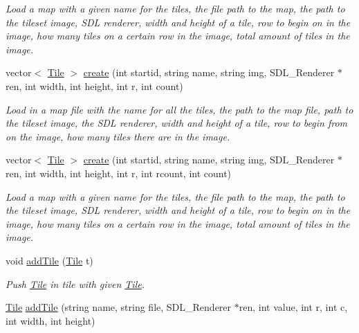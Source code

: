 \begin{DoxyCompactItemize}
\begin{DoxyCompactList}\small\item\em Load a map with a given name for the tiles, the file path to the map, the path to the tileset image, S\+DL renderer, width and height of a tile, row to begin on in the image, how many tiles on a certain row in the image, total amount of tiles in the image. \end{DoxyCompactList}\item 
vector$<$ \hyperlink{classTile}{Tile} $>$ \hyperlink{classTileset_a9d93cb00fc20938748075d94be118ed6}{create} (int startid, string name, string img, S\+D\+L\+\_\+\+Renderer $\ast$ren, int width, int height, int r, int count)\hypertarget{classTileset_a9d93cb00fc20938748075d94be118ed6}{}\label{classTileset_a9d93cb00fc20938748075d94be118ed6}

\begin{DoxyCompactList}\small\item\em Load in a map file with the name for all the tiles, the path to the map file, path to the tileset image, the S\+DL renderer, width and height of a tile, row to begin from on the image, how many tiles there are in the image. \end{DoxyCompactList}\item 
vector$<$ \hyperlink{classTile}{Tile} $>$ \hyperlink{classTileset_a7671c66fd7dfd4cf62524a5d518afbe6}{create} (int startid, string name, string img, S\+D\+L\+\_\+\+Renderer $\ast$ren, int width, int height, int r, int rcount, int count)\hypertarget{classTileset_a7671c66fd7dfd4cf62524a5d518afbe6}{}\label{classTileset_a7671c66fd7dfd4cf62524a5d518afbe6}

\begin{DoxyCompactList}\small\item\em Load a map with a given name for the tiles, the file path to the map, the path to the tileset image, S\+DL renderer, width and height of a tile, row to begin on in the image, how many tiles on a certain row in the image, total amount of tiles in the image. \end{DoxyCompactList}\item 
void \hyperlink{classTileset_a26acaabd06601aba2e277fdd2b750fc7}{add\+Tile} (\hyperlink{classTile}{Tile} t)\hypertarget{classTileset_a26acaabd06601aba2e277fdd2b750fc7}{}\label{classTileset_a26acaabd06601aba2e277fdd2b750fc7}

\begin{DoxyCompactList}\small\item\em Push \hyperlink{classTile}{Tile} in tile with given \hyperlink{classTile}{Tile}. \end{DoxyCompactList}\item 
\hyperlink{classTile}{Tile} \hyperlink{classTileset_aea4085286f450afdb53b22c917a77cba}{add\+Tile} (string name, string file, S\+D\+L\+\_\+\+Renderer $\ast$ren, int value, int r, int c, int width, int height)\hypertarget{classTileset_aea4085286f450afdb53b22c917a77cba}{}\label{classTileset_aea4085286f450afdb53b22c917a77cba}


\end{DoxyCompactItemize}
